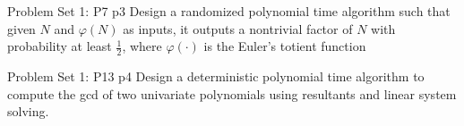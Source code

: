 \documentclass[a4paper, 11pt]{article}
\begin{document}
\begin{problem}{%
		Problem Set 1: P7
	}{p3%
	}
	Design a randomized polynomial time algorithm such that given $N$ and $\varphi(N)$ as inputs, it outputs a nontrivial factor of $N$ with probability at least $\frac12$, where $\varphi(\cdot)$ is the Euler’s totient function
\end{problem}
\solve{
}


\begin{problem}{%
		Problem Set 1: P13
	}{p4%
	}
	Design a deterministic polynomial time algorithm to compute the gcd of two univariate polynomials
	using resultants and linear system solving.
\end{problem}
\end{document}
